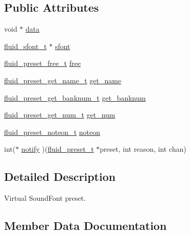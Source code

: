 \subsection*{Public Attributes}
\begin{DoxyCompactItemize}
\item 
void $\ast$ \hyperlink{struct__fluid__preset__t_afe0cdcf920e3014a4d84d1348cc88383}{data}
\item 
\hyperlink{types_8h_aa6c18288f76608acbb10b80a153f4ab8}{fluid\+\_\+sfont\+\_\+t} $\ast$ \hyperlink{struct__fluid__preset__t_a88abb2db089ec85c8793fadf6c6e12c3}{sfont}
\item 
\hyperlink{sfont_8h_af62be2bae1c11541218480db4ac138ac}{fluid\+\_\+preset\+\_\+free\+\_\+t} \hyperlink{struct__fluid__preset__t_aa67629f582bf35e758788a49951c0fa7}{free}
\item 
\hyperlink{sfont_8h_a082715382cb71f6b4f38f700b6437086}{fluid\+\_\+preset\+\_\+get\+\_\+name\+\_\+t} \hyperlink{struct__fluid__preset__t_a2c6ec391afa962c5c12c413ba9040292}{get\+\_\+name}
\item 
\hyperlink{sfont_8h_a01d401c6f13113c495564a3374a3b331}{fluid\+\_\+preset\+\_\+get\+\_\+banknum\+\_\+t} \hyperlink{struct__fluid__preset__t_aea8b37a9d87c15e9202507d923d0f865}{get\+\_\+banknum}
\item 
\hyperlink{sfont_8h_a833b5d3b8f625b7a708150471b584d76}{fluid\+\_\+preset\+\_\+get\+\_\+num\+\_\+t} \hyperlink{struct__fluid__preset__t_a5438b83a0b6a4263c0f922bd91045be6}{get\+\_\+num}
\item 
\hyperlink{sfont_8h_a5cfcda454cb43f8a6c87d9d99d902b57}{fluid\+\_\+preset\+\_\+noteon\+\_\+t} \hyperlink{struct__fluid__preset__t_a30a6b267606dfdb398c2fc2f5e141f31}{noteon}
\item 
int($\ast$ \hyperlink{struct__fluid__preset__t_a8d7afa59843094f13f69b7845116c081}{notify} )(\hyperlink{types_8h_a985e5ee05f433da841127750f67a4723}{fluid\+\_\+preset\+\_\+t} $\ast$preset, int reason, int chan)
\end{DoxyCompactItemize}


\subsection{Detailed Description}
Virtual Sound\+Font preset. 

\subsection{Member Data Documentation}
\mbox{\label{struct__fluid__preset__t_afe0cdcf920e3014a4d84d1348cc88383}} 
